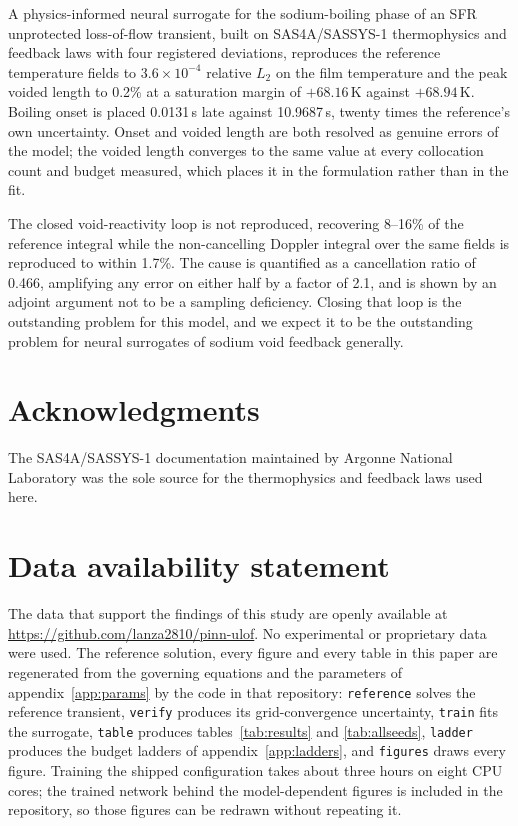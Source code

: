\documentclass[11pt,a4paper]{article}
\begin{document}
A physics-informed neural surrogate for the sodium-boiling phase of an SFR unprotected
loss-of-flow transient, built on SAS4A/SASSYS-1 thermophysics and feedback laws with four
registered deviations, reproduces the reference temperature fields to $3.6\times10^{-4}$
relative $L_2$ on the film temperature and the peak voided length to 0.2\% at a saturation
margin of $+68.16$\,K against $+68.94$\,K. Boiling onset is placed 0.0131\,s late against
10.9687\,s, twenty times the reference's own uncertainty. Onset and voided length are both
resolved as genuine errors of the model; the voided length converges to the same value at
every collocation count and budget measured, which places it in the formulation rather than
in the fit.

The closed void-reactivity loop is not reproduced, recovering 8--16\% of the reference
integral while the non-cancelling Doppler integral over the same fields is reproduced to
within 1.7\%.
The cause is quantified as a cancellation ratio of 0.466, amplifying any error on either
half by a factor of 2.1, and is shown by an adjoint argument not to be a sampling
deficiency. Closing that loop is the outstanding problem for this model, and we expect it to
be the outstanding problem for neural surrogates of sodium void feedback generally.


\section*{Acknowledgments}

The SAS4A/SASSYS-1 documentation maintained by Argonne National Laboratory was the sole
source for the thermophysics and feedback laws used here.

\section*{Data availability statement}

The data that support the findings of this study are openly available at
\url{https://github.com/lanza2810/pinn-ulof}. No experimental or proprietary data were used.
The reference solution, every figure and every table in this paper are regenerated from the
governing equations and the parameters of appendix~\ref{app:params} by the code in that
repository: \texttt{reference} solves the reference transient, \texttt{verify} produces its
grid-convergence uncertainty, \texttt{train} fits the surrogate, \texttt{table} produces
tables~\ref{tab:results} and \ref{tab:allseeds}, \texttt{ladder} produces the budget ladders
of appendix~\ref{app:ladders}, and \texttt{figures} draws every figure. Training the shipped
configuration takes about three hours on eight CPU cores; the trained network behind the
model-dependent figures is included in the repository, so those figures can be redrawn
without repeating it.
\end{document}
